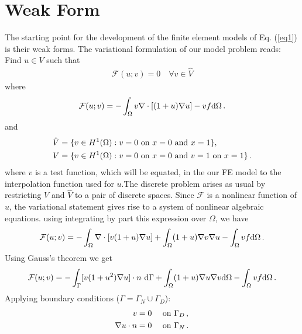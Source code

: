 \documentclass[]{article}
\begin{document}
\section{Weak Form} \label{sec: wf}
The starting point for the development of the finite element models of Eq. (\ref{eq1}) is their weak forms.
The variational formulation of our model problem reads: Find $u \in V$ such that
\begin{equation}\label{eq4}
	\begin{aligned}
		\mathcal{F}(u;v) = 0 \quad \forall v \in \hat{V}
	\end{aligned}
\end{equation}
where
\begin{equation}\label{eq5}
	\begin{aligned}
		\mathcal{F}(u; v) =-\int_\Omega v \nabla \cdot[(1+u) \nabla u] - v f \mathrm{d}\Omega\thinspace .
	\end{aligned}
\end{equation}
and
\begin{equation}\label{eq6}
	\begin{aligned}
		\hat{V} &= \{v \in H^1(\Omega) : v = 0 \text{ on } x=0\mbox{ and }x=1\}, \\
		V &= \{v \in H^1(\Omega) : v = 0 \text{ on } x=0\text{ and } v = 1\text{ on }x=1\}\thinspace.
	\end{aligned}
\end{equation}
where $v$ is a test function, which will be equated, in the our FE model to the interpolation function used for $u$.The discrete problem arises as usual by restricting $V$ and $\hat{V}$ to a pair of discrete spaces. Since $\mathcal{F}$ is a nonlinear function of $u$, the variational statement gives rise to a system of nonlinear algebraic equations. using integrating by part this expression over $\Omega$, we have
\begin{equation}\label{eq8}
	\begin{aligned}
		\mathcal{F}(u; v) = -\int_{\Omega} \nabla \cdot [v (1+u) \nabla u] + \int_{\Omega}  (1+u)\nabla v\nabla u - \int_{\Omega} v f \mathrm{d}\Omega\thinspace .
	\end{aligned}
\end{equation}
Using Gauss’s theorem we get
\begin{equation}\label{eq9}
	\begin{aligned}
		\mathcal{F}(u; v) =  -\int_{\Gamma} [v (1+u^2) \nabla u] \cdot n \ \mathrm{d} \Gamma + \int_{\Omega} (1+u)\nabla u \nabla v \mathrm{d} \Omega - \int_{\Omega} v f \mathrm{d} \Omega\thinspace .
	\end{aligned}
\end{equation}
Applying boundary conditions ($\Gamma = \Gamma_N \cup \Gamma_D$):
\begin{equation}\label{eq10}
	\begin{aligned}
		v= 0 \quad &\text{ on } \Gamma_D\thinspace, \\
		\nabla u \cdot n = 0 \quad &\text{ on } \Gamma_N \thinspace.
	\end{aligned}
\end{equation}
\end{document}
